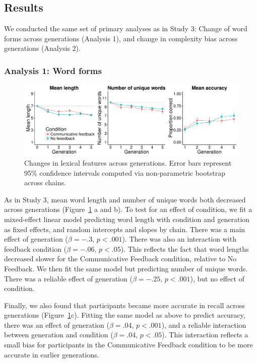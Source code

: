 \subsection{Results}

We conducted the same set of primary analyses as in Study 3: Change of word forms across generations (Analysis 1), and change in complexity bias across generations (Analysis 2). 

\subsubsection{Analysis 1: Word forms}

\begin{figure}[t!]
\begin{center}
\includegraphics[scale = .5]{figs/chap4_4.pdf}
\end{center}
\caption{Changes in lexical features across generations. Error bars represent 95\% confidence intervals computed via non-parametric bootstrap across chains. }
\label{fig:length_4}
\end{figure}

As in Study 3,  mean word length and number of unique words both decreased across generations (Figure\ \ref{fig:length_4} a and b). To test for an effect of condition, we fit a mixed-effect linear model predicting word length with  condition and generation as fixed effects, and random intercepts and slopes by chain. There was a main effect of generation ($\beta=-.3$, $p <.001$). There was also an interaction with feedback condition ($\beta=-.06$, $p <.05$). This reflects the fact that word lengths decreased slower for the Communicative Feedback condition, relative to No Feedback. We then fit the same model but predicting number of unique words. There was a reliable effect of generation ($\beta=-.25$, $p <.001$), but no effect of condition.

Finally, we also found that participants became more accurate in recall across generations (Figure\ \ref{fig:length_4}c). Fitting the same model as above to predict accuracy, there was an effect of generation ($\beta=.04$, $p <.001$), and a reliable interaction between generation and condition  ($\beta=.04$, $p <.05$). This interaction reflects a small bias for participants in the Communicative Feedback condition to be more accurate in earlier generations. 

